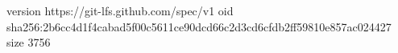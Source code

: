 version https://git-lfs.github.com/spec/v1
oid sha256:2b6cc4d1f4cabad5f00c5611ce90dcd66c2d3cd6cfdb2ff59810e857ac024427
size 3756
